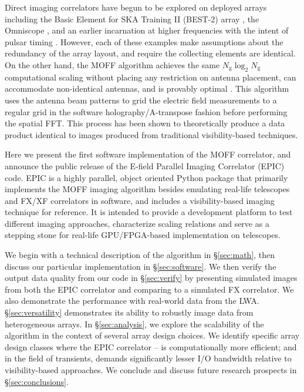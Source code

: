 \documentclass[a4paper,fleqn,usenatbib]{mnras}
\newcommand{\Ngrid}{N_\textrm{g}}
\begin{document}
Direct imaging correlators have begun to be explored on deployed arrays including
the Basic Element for SKA Training II (BEST-2) array \citep{fos14}, the Omniscope
\citep{zhe14}, and an earlier incarnation at higher frequencies with the intent
of pulsar timing \citep{oto94, dai00}. However, each of these examples make
assumptions about the redundancy of the array layout, and require the collecting
elements are identical. On the other hand, the MOFF algorithm achieves the same
$\Ngrid \log_2 \Ngrid$ computational scaling without placing any restriction on
antenna placement, can accommodate non-identical antennas, and is provably 
optimal \citep{mor11}. This algorithm uses the antenna beam patterns to 
grid the electric field measurements to a regular grid in the software 
holography/A-transpose fashion \citep{mor09,bha08,teg97b} before performing the
spatial FFT. This process has been shown to theoretically produce a data product
identical to images produced from traditional visibility-based techniques.

Here we present the first software implementation of the MOFF correlator, and
announce the public release of the E-field Parallel Imaging Correlator (EPIC)
code. EPIC is a highly parallel, object oriented Python package that primarily 
implements the MOFF imaging algorithm besides emulating real-life telescopes and 
FX/XF correlators in software, and includes a visibility-based imaging technique 
for reference. It is intended to provide a development platform to test different 
imaging approaches, characterize scaling relations and serve as a stepping stone 
for real-life GPU/FPGA-based implementation on telescopes.

We begin with a technical description of the algorithm in \S\ref{sec:math}, then discuss our particular implementation in \S\ref{sec:software}. We then verify the output data quality from our code in \S\ref{sec:verify} by presenting simulated images from both the EPIC correlator and comparing to a simulated FX correlator. We also demonstrate the performance with real-world data from the LWA. \S\ref{sec:versatility} demonstrates its ability to robustly image data from heterogeneous arrays. In \S\ref{sec:analysis}, we explore the scalability of the algorithm in the context of several array design choices. We identify specific array design classes where the EPIC correlator -- is computationally more efficient; and in the field of transients, demands significantly lesser I/O bandwidth relative to visibility-based approaches. We conclude and discuss future research prospects in \S\ref{sec:conclusions}.
\end{document}
